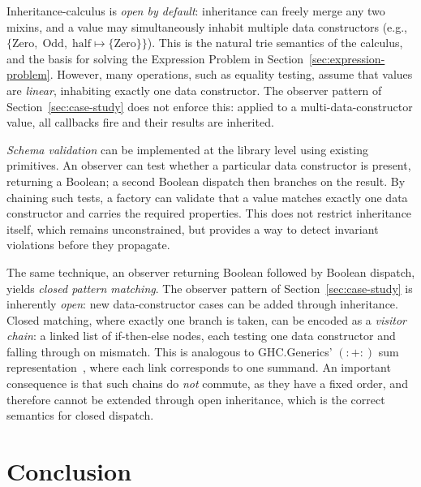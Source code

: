 Inheritance-calculus is \emph{open by default}: inheritance
can freely merge any two mixins, and a value may simultaneously
inhabit multiple data constructors (e.g.,
$\{\mathrm{Zero},\; \mathrm{Odd},\; \mathrm{half} \mapsto \{\mathrm{Zero}\}\}$).
This is the natural trie semantics of the
calculus, and the basis for solving the Expression Problem
in Section~\ref{sec:expression-problem}.
However, many operations, such as equality testing, assume that values
are \emph{linear}, inhabiting exactly one data constructor.
The observer pattern of Section~\ref{sec:case-study} does not enforce
this: applied to a multi-data-constructor value, all callbacks fire and
their results are inherited.

\emph{Schema validation} can be implemented at the library level
using existing primitives.
An observer can test whether a particular data constructor is present,
returning a Boolean; a second Boolean dispatch then branches on the
result.
By chaining such tests, a factory can validate that a value matches
exactly one data constructor and carries the required properties.
This does not restrict inheritance itself, which remains
unconstrained, but provides a way to detect invariant violations
before they propagate.

The same technique, an observer returning Boolean followed by Boolean
dispatch, yields \emph{closed pattern matching}.
The observer pattern of Section~\ref{sec:case-study} is inherently
\emph{open}: new data-constructor cases can be added through inheritance.
Closed matching, where exactly one branch is taken, can be encoded as
a \emph{visitor chain}: a linked list of if-then-else nodes, each
testing one data constructor and falling through on mismatch.
This is analogous to GHC.Generics' $\mathrm{(:+:)}$ sum
representation~\cite{magalhaes2010-generic-deriving}, where each link
corresponds to one summand.
An important consequence is that such chains do \emph{not}
commute, as they have a fixed order, and therefore cannot be extended
through open inheritance, which is the correct semantics for closed
dispatch.

\section{Conclusion}

